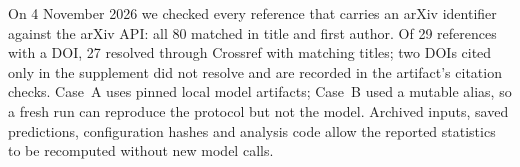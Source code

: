 On 4 November 2026 we checked every reference that carries an arXiv identifier against the arXiv API: all 80 matched in title and first author. Of 29 references with a DOI, 27 resolved through Crossref with matching titles; two DOIs cited only in the supplement did not resolve and are recorded in the artifact's citation checks. Case~A uses pinned local model artifacts; Case~B used a mutable alias, so a fresh run can reproduce the protocol but not the model. Archived inputs, saved predictions, configuration hashes and analysis code allow the reported statistics to be recomputed without new model calls.
